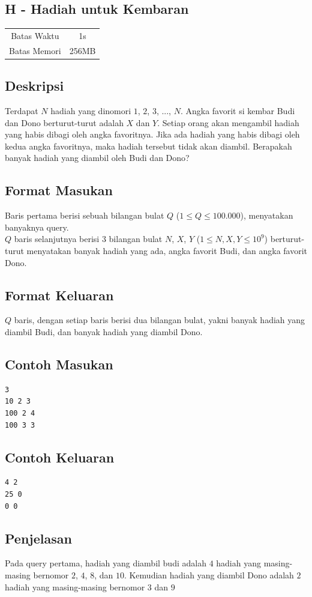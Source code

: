 \documentclass{article}
\begin{document}
\begin{center}
    \section*{H - Hadiah untuk Kembaran} %

    \begin{tabular}{ | c c | }
        \hline
        Batas Waktu  & 1s \\    %
        Batas Memori & 256MB \\  %
        \hline
    \end{tabular}
\end{center}

\subsection*{Deskripsi}

Terdapat $N$ hadiah yang dinomori $1$, $2$, $3$, ..., $N$. Angka favorit si kembar Budi dan Dono berturut-turut adalah $X$ dan $Y$. Setiap orang akan mengambil hadiah yang habis dibagi oleh angka favoritnya. Jika ada hadiah yang habis dibagi oleh kedua angka favoritnya, maka hadiah tersebut tidak akan diambil. Berapakah banyak hadiah yang diambil oleh Budi dan Dono?

\subsection*{Format Masukan}

Baris pertama berisi sebuah bilangan bulat $Q$ ($1 \leq Q \leq 100.000$), menyatakan banyaknya query.
\\
$Q$ baris selanjutnya berisi $3$ bilangan bulat $N$, $X$, $Y$ ($1 \leq N, X, Y \leq 10^9$) berturut-turut menyatakan banyak hadiah yang ada, angka favorit Budi, dan angka favorit Dono.

\subsection*{Format Keluaran}

$Q$ baris, dengan setiap baris berisi dua bilangan bulat, yakni banyak hadiah yang diambil Budi, dan banyak hadiah yang diambil Dono.


\begin{multicols}{2}
\subsection*{Contoh Masukan}
\begin{lstlisting}
3
10 2 3
100 2 4
100 3 3
\end{lstlisting}
\columnbreak
\subsection*{Contoh Keluaran}
\begin{lstlisting}
4 2
25 0
0 0
\end{lstlisting}
\vfill
\null
\end{multicols}

\subsection*{Penjelasan}
Pada query pertama, hadiah yang diambil budi adalah $4$ hadiah yang masing-masing bernomor $2$, $4$, $8$, dan $10$. Kemudian hadiah yang diambil Dono adalah $2$ hadiah yang masing-masing bernomor $3$ dan $9$

\pagebreak
\end{document}
